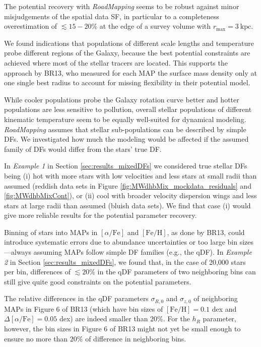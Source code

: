 \documentclass[iop,revtex4,numberedappendix,appendixfloats]{emulateapj}
\newcommand{\MAP}{MAP}
\newcommand{\MAPs}{MAPs}
\newcommand{\RM}{{\sl RoadMapping}}
\begin{document}
The potential recovery with \RM{} seems to be robust against minor misjudgements of the spatial data SF, in particular to a completeness overestimation of $\lesssim 15-20\%$ at the edge of a survey volume with $r_\text{max}=3~\text{kpc}$.

We found indications that populations of different scale lengths and temperature probe different regions of the Galaxy, because the best potential constraints are achieved where most of the stellar tracers are located. This supports the approach by BR13, who measured for each \MAP{} the surface mass density only at one single best radius to account for missing flexibility in their potential model. 

While cooler populations probe the Galaxy rotation curve better and hotter populations are less sensitive to pollution, overall stellar populations of different kinematic temperature seem to be equally well-suited for dynamical modeling.\\

 \RM{} assumes that stellar sub-populations can be described by simple DFs. We investigated how much the modeling would be affected if the assumed family of DFs would differ from the stars' true DF.

In \emph{Example 1} in Section \ref{sec:results_mixedDFs} we considered true stellar DFs being (i) hot with more stars with low velocities and less stars at small radii than assumed (reddish data sets in Figure \ref{fig:MWdhbMix_mockdata_residuals} and \ref{fig:MWdhbMixCont}), or (ii) cool with broader velocity dispersion wings and less stars at large radii than assumed (bluish data sets). We find that case (i) would give more reliable results for the potential parameter recovery.

Binning of stars into \MAPs{} in $[\alpha/\mathrm{Fe}]$ and $[\mathrm{Fe}/\mathrm{H}]$, as done by BR13, could introduce systematic errors due to abundance uncertainties or too large bin sizes---always assuming \MAPs{} follow simple DF families (e.g., the qDF). In \emph{Example 2} in Section \ref{sec:results_mixedDFs}, we found that, in the case of 20,000 stars per bin, differences of $\lesssim 20\%$ in the qDF parameters of two neighboring bins can still give quite good constraints on the potential parameters.

The relative differences in the qDF parameters $\sigma_{R,0}$ and $\sigma_{z,0}$ of neighboring \MAPs{} in Figure 6 of BR13 (which have bin sizes of $[\mathrm{Fe}/\mathrm{H}] = 0.1$ dex and $\Delta [\alpha/\mathrm{Fe}] = 0.05$ dex) are indeed smaller than $20\%$. For the $h_R$ parameter, however, the bin sizes in Figure 6 of BR13 might not yet be small enough to ensure no more than $20\%$ of difference in neighboring bins.
\end{document}
